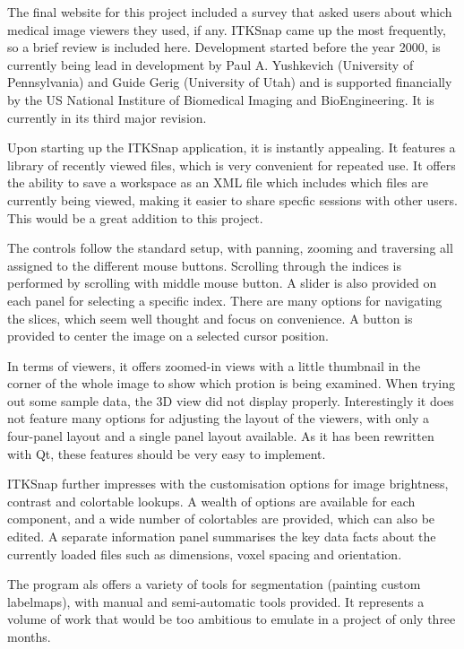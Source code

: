 \documentclass[a4paper,11pt,twoside]{article}
\begin{document}
The final website for this project included a survey that asked users about which medical image viewers they used, if any. ITKSnap came up the most frequently, so a brief review is included here. Development started before the year 2000, is currently being lead in development by Paul A. Yushkevich (University of Pennsylvania) and Guide Gerig (University of Utah) and is supported financially by the US National Institure of Biomedical Imaging and BioEngineering. It is currently in its third major revision.

Upon starting up the ITKSnap application, it is instantly appealing. It features a library of recently viewed files, which is very convenient for repeated use. It offers the ability to save a workspace as an XML file which includes which files are currently being viewed, making it easier to share specfic sessions with other users. This would be a great addition to this project.

The controls follow the standard setup, with panning, zooming and traversing all assigned to the different mouse buttons. Scrolling through the indices is performed by scrolling with middle mouse button. A slider is also provided on each panel for selecting a specific index. There are many options for navigating the slices, which seem well thought and focus on convenience. A button is provided to center the image on a selected cursor position.

In terms of viewers, it offers zoomed-in views with a little thumbnail in the corner of the whole image to show which protion is being examined. When trying out some sample data, the 3D view did not display properly. Interestingly it does not feature many options for adjusting the layout of the viewers, with only a four-panel layout and a single panel layout available. As it has been rewritten with Qt, these features should be very easy to implement.

ITKSnap further impresses with the customisation options for image brightness, contrast and colortable lookups. A wealth of options are available for each component, and a wide number of colortables are provided, which can also be edited. A separate information panel summarises the key data facts about the currently loaded files such as dimensions, voxel spacing and orientation.

The program als offers a variety of tools for segmentation (painting custom labelmaps), with manual and semi-automatic tools provided. It represents a volume of work that would be too ambitious to emulate in a project of only three months.
\end{document}
